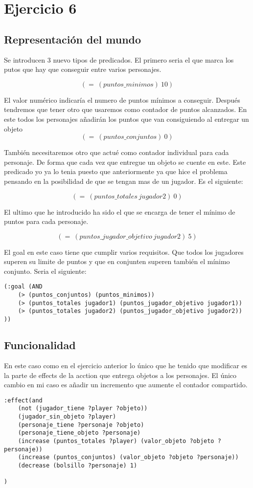 \documentclass[]{article}
\begin{document}
	\section{Ejercicio 6}
	\subsection{Representación del mundo}
	Se introducen 3 nuevo tipos de predicados. El primero seria el que marca los putos que hay que conseguir entre varios personajes.
	
	$$
	(=\ (puntos\_minimos)\ 10)
	$$
	
	El valor numérico indicaría el numero de puntos mínimos a conseguir.
	Después tendremos que tener otro que usaremos como contador de puntos alcanzados. En este todos los personajes añadirán los puntos que van consiguiendo al entregar un objeto
	$$
	(=\ (puntos\_conjuntos)\ 0)
	$$
	
	También necesitaremos otro que actué como contador individual para cada personaje. De forma que cada vez que entregue un objeto se cuente en este. Este predicado yo ya lo tenia puesto que anteriormente ya que hice el problema pensando en la posibilidad de que se tengan mas de un jugador. Es el siguiente:
	
	$$
	(=\ (puntos\_totales\ jugador2)\ 0)
	$$
	
	El ultimo que he introducido ha sido el que se encarga de tener el mínimo de puntos para cada personaje. 
	
	$$
	(=\ (puntos\_jugador\_objetivo\ jugador2)\ 5)
	$$
	
	El goal en este caso tiene que cumplir varios requisitos. Que todos los jugadores superen su limite de puntos y que en conjunten superen también el mínimo conjunto. Seria el siguiente:
\begin{lstlisting}
(:goal (AND
	(> (puntos_conjuntos) (puntos_minimos))
	(> (puntos_totales jugador1) (puntos_jugador_objetivo jugador1))
	(> (puntos_totales jugador2) (puntos_jugador_objetivo jugador2))
))
\end{lstlisting}	
	
	
	
	
	\subsection{Funcionalidad}
	En este caso como en el ejercicio anterior lo único que he tenido que modificar es la parte de effects de la acction que entrega objetos a los personajes. El único cambio en mi caso es añadir un incremento que aumente el contador compartido.
	
	
	\begin{lstlisting}
:effect(and 
	(not (jugador_tiene ?player ?objeto))
	(jugador_sin_objeto ?player)
	(personaje_tiene ?personaje ?objeto)
	(personaje_tiene_objeto ?personaje)
	(increase (puntos_totales ?player) (valor_objeto ?objeto ?personaje))
	(increase (puntos_conjuntos) (valor_objeto ?objeto ?personaje))
	(decrease (bolsillo ?personaje) 1)

)
	\end{lstlisting}
	
	
\end{document}
